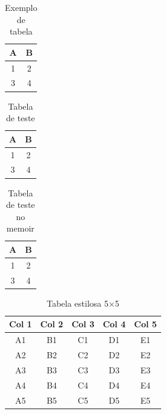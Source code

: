 \documentclass[12pt,
    a4paper,
    oneside,
    oldfontcommands]
{memoir}
\begin{document}
\begin{table}[h]
    \centering
    \caption{Exemplo de tabela}
    \label{tab:exemplo}
    \begin{tabular}{c c}
        \hline
        A & B \\ \hline
        1 & 2 \\
        3 & 4 \\
        \hline
    \end{tabular}
\end{table}




\begin{table}[h]
    \centering
    \caption{Tabela de teste}
    \label{tab:teste}
    \begin{tabular}{c c}
        \toprule
        A & B \\
        \midrule
        1 & 2 \\
        3 & 4 \\
        \bottomrule
    \end{tabular}
\end{table}



\begin{table}[h]
    \centering
    \caption{Tabela de teste no memoir}
    \label{tab:teste}
    \begin{tabular}{|c|c|}
        \hline
        A & B \\ \hline
        1 & 2 \\ \hline
        3 & 4 \\ \hline
    \end{tabular}
\end{table}









\begin{table}[h]
    \centering
    \caption{Tabela estilosa 5×5}
    \label{tab:estilosa}
    \begin{tabular}{ccccc}
        \toprule
        Col 1 & Col 2 & Col 3 & Col 4 & Col 5 \\
        \midrule
        A1 & B1 & C1 & D1 & E1 \\
        A2 & B2 & C2 & D2 & E2 \\
        A3 & B3 & C3 & D3 & E3 \\
        A4 & B4 & C4 & D4 & E4 \\
        A5 & B5 & C5 & D5 & E5 \\
        \bottomrule
    \end{tabular}
\end{table}
\end{document}
